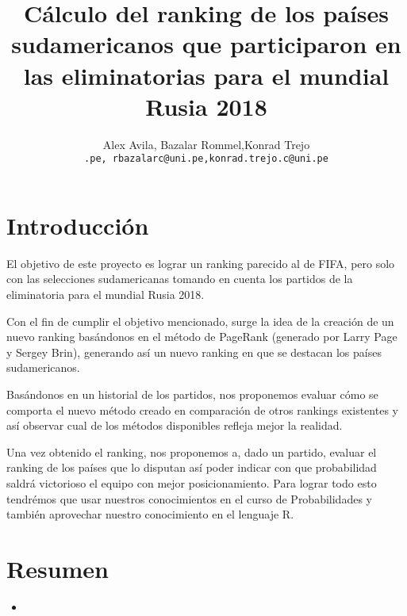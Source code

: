 \documentclass[twocolumn]{article}
\begin{document}
 

\title{
Cálculo del ranking de los países sudamericanos que participaron en las eliminatorias para el mundial Rusia 2018 
}
\date{}
\author{Alex Avila, Bazalar Rommel,Konrad Trejo\\
\small{\texttt{\@aavilas@uni.pe, rbazalarc@uni.pe,konrad.trejo.c@uni.pe}}}
\maketitle



\section{Introducción}

	El objetivo de este proyecto es lograr un ranking parecido al de FIFA, pero solo con las selecciones sudamericanas tomando en cuenta los partidos de la eliminatoria para el mundial Rusia 2018.

	Con el fin de cumplir el objetivo mencionado, surge la idea de la creación de un nuevo ranking basándonos en el método de PageRank (generado por Larry Page y Sergey Brin), generando así un nuevo ranking en que se destacan los países sudamericanos.

	Basándonos en un historial de los partidos, nos proponemos evaluar cómo se comporta el nuevo método creado en comparación de otros rankings existentes y así observar cual de los métodos disponibles refleja mejor la realidad.

	Una vez obtenido el ranking, nos proponemos a, dado un partido, evaluar el ranking de los países que lo disputan  así poder indicar con que probabilidad saldrá victorioso el equipo con mejor posicionamiento. Para lograr todo esto tendrémos que usar nuestros conocimientos en el curso de Probabilidades y también aprovechar nuestro conocimiento en el lenguaje R.


\section{Resumen}
\begin{itemize}
\item 
\end{itemize}

\end{document}
